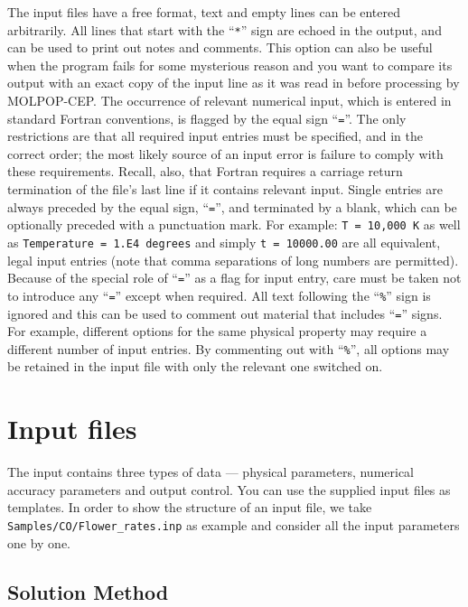 \documentclass[12pt]{article}
\def\M{MOLPOP-CEP}
\begin{document}
The input files have a free format, text and empty lines can be entered
arbitrarily. All lines that start with the ``\texttt{*}'' sign are echoed in
the output, and can be used to print out notes and comments. This option can
also be useful when the program fails for some mysterious reason and you want
to compare its output with an exact copy of the input line as it was read in
before processing by \M. The occurrence of relevant numerical input, which is
entered in standard Fortran conventions, is flagged by the equal sign
``\texttt{=}''. The only restrictions are that all required input entries must
be specified, and in the correct order; the most likely source of an input
error is failure to comply with these requirements.  Recall, also, that Fortran
requires a carriage return termination of the file's last line if it contains
relevant input. Single entries are always preceded by the equal sign,
``\texttt{=}'', and terminated by a blank, which can be optionally preceded
with a punctuation mark.  For example: \texttt{T = 10,000 K} as well as
\texttt{Temperature = 1.E4 degrees} and simply \texttt{t = 10000.00} are all
equivalent, legal input entries (note that comma separations of long numbers
are permitted).  Because of the special role of ``\texttt{=}'' as a flag for
input entry, care must be taken not to introduce any ``\texttt{=}'' except when
required.  All text following the ``\texttt{\%}'' sign is ignored and this can
be used to comment out material that includes ``\texttt{=}'' signs.  For
example, different options for the same physical property may require a
different number of input entries. By commenting out with ``\texttt{\%}'', all
options may be retained in the input file with only the relevant one switched
on.


%

\section{Input files}

The input contains three types of data --- physical parameters, numerical
accuracy parameters and output control.  You can use the supplied input files
as templates. In order to show the structure of an input file, we take
\texttt{Samples/CO/Flower\_rates.inp} as example and consider all the input
parameters one by one.

\subsection{Solution Method}
\end{document}

